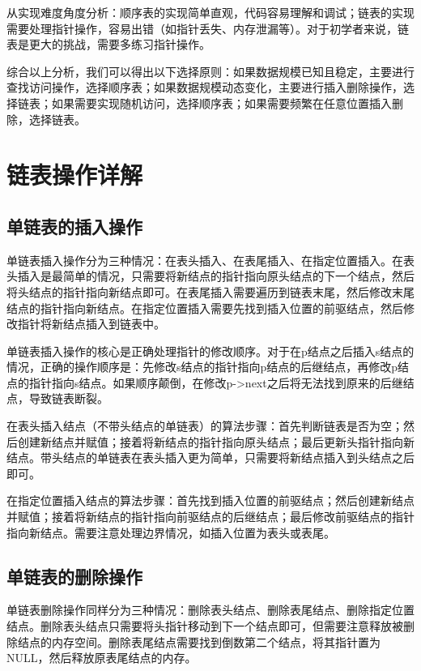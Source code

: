 \documentclass[12pt, a4paper]{article}
\begin{document}
从实现难度角度分析：顺序表的实现简单直观，代码容易理解和调试；链表的实现需要处理指针操作，容易出错（如指针丢失、内存泄漏等）。对于初学者来说，链表是更大的挑战，需要多练习指针操作。

综合以上分析，我们可以得出以下选择原则：如果数据规模已知且稳定，主要进行查找访问操作，选择顺序表；如果数据规模动态变化，主要进行插入删除操作，选择链表；如果需要实现随机访问，选择顺序表；如果需要频繁在任意位置插入删除，选择链表。

\section{链表操作详解}

\subsection{单链表的插入操作}

单链表插入操作分为三种情况：在表头插入、在表尾插入、在指定位置插入。在表头插入是最简单的情况，只需要将新结点的指针指向原头结点的下一个结点，然后将头结点的指针指向新结点即可。在表尾插入需要遍历到链表末尾，然后修改末尾结点的指针指向新结点。在指定位置插入需要先找到插入位置的前驱结点，然后修改指针将新结点插入到链表中。

单链表插入操作的核心是正确处理指针的修改顺序。对于在p结点之后插入s结点的情况，正确的操作顺序是：先修改s结点的指针指向p结点的后继结点，再修改p结点的指针指向s结点。如果顺序颠倒，在修改p->next之后将无法找到原来的后继结点，导致链表断裂。

在表头插入结点（不带头结点的单链表）的算法步骤：首先判断链表是否为空；然后创建新结点并赋值；接着将新结点的指针指向原头结点；最后更新头指针指向新结点。带头结点的单链表在表头插入更为简单，只需要将新结点插入到头结点之后即可。

在指定位置插入结点的算法步骤：首先找到插入位置的前驱结点；然后创建新结点并赋值；接着将新结点的指针指向前驱结点的后继结点；最后修改前驱结点的指针指向新结点。需要注意处理边界情况，如插入位置为表头或表尾。

\subsection{单链表的删除操作}

单链表删除操作同样分为三种情况：删除表头结点、删除表尾结点、删除指定位置结点。删除表头结点只需要将头指针移动到下一个结点即可，但需要注意释放被删除结点的内存空间。删除表尾结点需要找到倒数第二个结点，将其指针置为NULL，然后释放原表尾结点的内存。
\end{document}
